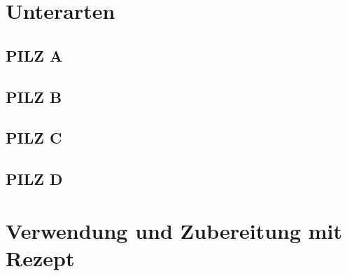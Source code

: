 \documentclass[a4paper,abstracton]{scrreprt}
\begin{document}
\section{Unterarten}
\subsection{PILZ A}
\subsection{PILZ B}
\subsection{PILZ C}
\subsection{PILZ D}
\section{Verwendung und Zubereitung mit Rezept}

\printbibliography[heading=lit]
\end{document}
